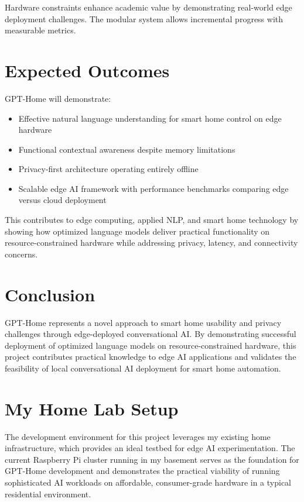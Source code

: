 \documentclass[12pt]{article}
\begin{document}
Hardware constraints enhance academic value by demonstrating real-world edge deployment challenges. The modular system allows incremental progress with measurable metrics.

\section{Expected Outcomes}

GPT-Home will demonstrate:
\begin{itemize}
\item Effective natural language understanding for smart home control on edge hardware
\item Functional contextual awareness despite memory limitations
\item Privacy-first architecture operating entirely offline
\item Scalable edge AI framework with performance benchmarks comparing edge versus cloud deployment
\end{itemize}

This contributes to edge computing, applied NLP, and smart home technology by showing how optimized language models deliver practical functionality on resource-constrained hardware while addressing privacy, latency, and connectivity concerns.

\section{Conclusion}

GPT-Home represents a novel approach to smart home usability and privacy challenges through edge-deployed conversational AI. By demonstrating successful deployment of optimized language models on resource-constrained hardware, this project contributes practical knowledge to edge AI applications and validates the feasibility of local conversational AI deployment for smart home automation.

\section{My Home Lab Setup}

The development environment for this project leverages my existing home infrastructure, which provides an ideal testbed for edge AI experimentation. The current Raspberry Pi cluster running in my basement serves as the foundation for GPT-Home development and demonstrates the practical viability of running sophisticated AI workloads on affordable, consumer-grade hardware in a typical residential environment.
\end{document}
